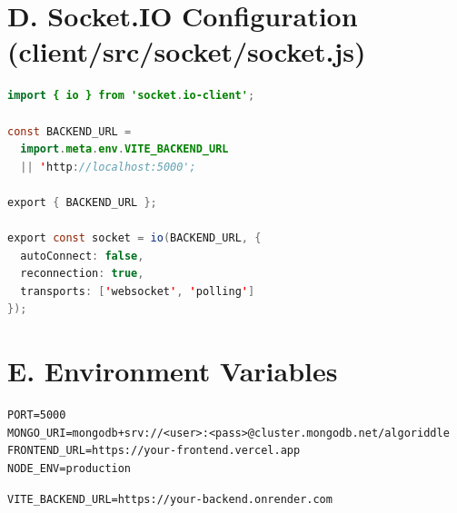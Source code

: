 \section*{D. Socket.IO Configuration (client/src/socket/socket.js)}

\begin{lstlisting}[language=Java, caption={Client-Side Socket.IO Configuration}]
import { io } from 'socket.io-client';

const BACKEND_URL =
  import.meta.env.VITE_BACKEND_URL
  || 'http://localhost:5000';

export { BACKEND_URL };

export const socket = io(BACKEND_URL, {
  autoConnect: false,
  reconnection: true,
  transports: ['websocket', 'polling']
});
\end{lstlisting}

\section*{E. Environment Variables}

\begin{lstlisting}[language={}, caption={Server Environment Variables (.env)}]
PORT=5000
MONGO_URI=mongodb+srv://<user>:<pass>@cluster.mongodb.net/algoriddle
FRONTEND_URL=https://your-frontend.vercel.app
NODE_ENV=production
\end{lstlisting}

\begin{lstlisting}[language={}, caption={Client Environment Variables (.env)}]
VITE_BACKEND_URL=https://your-backend.onrender.com
\end{lstlisting}
